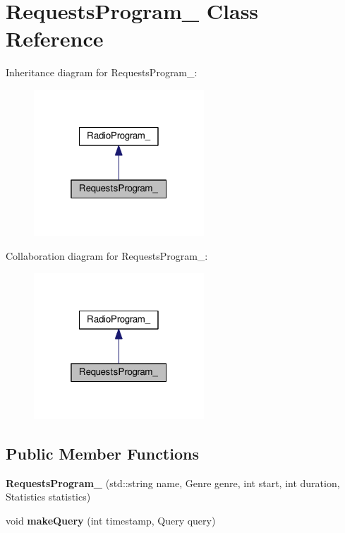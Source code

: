 \hypertarget{class_requests_program__}{}\section{Requests\+Program\+\_\+ Class Reference}
\label{class_requests_program__}


Inheritance diagram for Requests\+Program\+\_\+\+:
\nopagebreak
\begin{figure}[H]
\begin{center}
\leavevmode
\includegraphics[width=181pt]{class_requests_program____inherit__graph}
\end{center}
\end{figure}


Collaboration diagram for Requests\+Program\+\_\+\+:
\nopagebreak
\begin{figure}[H]
\begin{center}
\leavevmode
\includegraphics[width=181pt]{class_requests_program____coll__graph}
\end{center}
\end{figure}
\subsection*{Public Member Functions}
\begin{DoxyCompactItemize}
\item 
{\bfseries Requests\+Program\+\_\+} (std\+::string name, Genre genre, int start, int duration, Statistics statistics)\hypertarget{class_requests_program___a59ed61531c124550d37a45520553b123}{}\label{class_requests_program___a59ed61531c124550d37a45520553b123}

\item 
void {\bfseries make\+Query} (int timestamp, Query query)\hypertarget{class_requests_program___a88122fe77f3c341fe2b72d4612e4d7f6}{}\label{class_requests_program___a88122fe77f3c341fe2b72d4612e4d7f6}

\end{DoxyCompactItemize}
